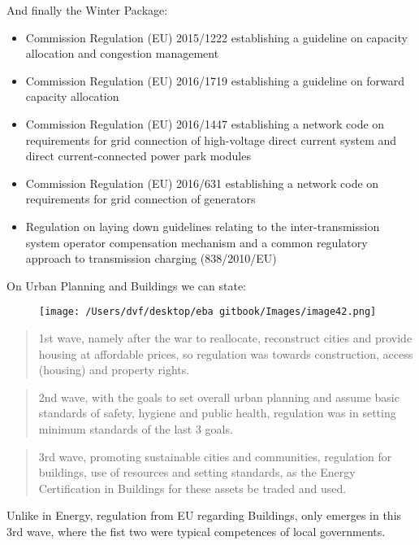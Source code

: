 \documentclass[]{book}
\theoremstyle{definition}
\theoremstyle{definition}
\theoremstyle{definition}
\theoremstyle{remark}
\begin{document}
And finally the Winter Package:

\begin{itemize}
\item
  Commission Regulation (EU) 2015/1222 establishing a guideline on
  capacity allocation and congestion management
\item
  Commission Regulation (EU) 2016/1719 establishing a guideline on
  forward capacity allocation
\item
  Commission Regulation (EU) 2016/1447 establishing a network code on
  requirements for grid connection of high-voltage direct current system
  and direct current-connected power park modules
\item
  Commission Regulation (EU) 2016/631 establishing a network code on
  requirements for grid connection of generators
\item
  Regulation on laying down guidelines relating to the
  inter-transmission system operator compensation mechanism and a common
  regulatory approach to transmission charging (838/2010/EU)
\end{itemize}

On Urban Planning and Buildings we can state:

\begin{figure}[htbp]
\centering
\texttt{[image: /Users/dvf/desktop/eba gitbook/Images/image42.png]}
\caption{}
\end{figure}

\begin{quote}
1st wave, namely after the war to reallocate, reconstruct cities and
provide housing at affordable prices, so regulation was towards
construction, access (housing) and property rights.
\end{quote}

\begin{quote}
2nd wave, with the goals to set overall urban planning and assume basic
standards of safety, hygiene and public health, regulation was in
setting minimum standards of the last 3 goals.
\end{quote}

\begin{quote}
3rd wave, promoting sustainable cities and communities, regulation for
buildings, use of resources and setting standards, as the Energy
Certification in Buildings for these assets be traded and used.
\end{quote}

Unlike in Energy, regulation from EU regarding Buildings, only emerges
in this 3rd wave, where the fist two were typical competences of local
governments.
\end{document}
